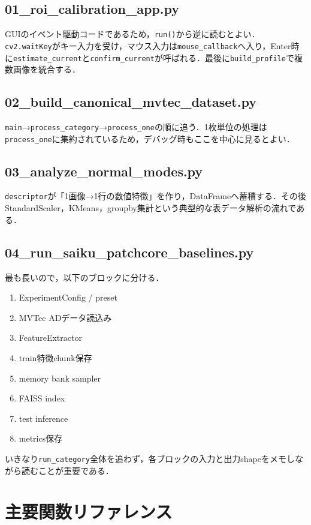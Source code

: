 \documentclass[a4paper,11pt]{ltjsreport}
\begin{document}
\section{01\_roi\_calibration\_app.py}
GUIのイベント駆動コードであるため，\texttt{run()}から逆に読むとよい．\texttt{cv2.waitKey}がキー入力を受け，マウス入力は\texttt{mouse\_callback}へ入り，Enter時に\texttt{estimate\_current}と\texttt{confirm\_current}が呼ばれる．最後に\texttt{build\_profile}で複数画像を統合する．

\section{02\_build\_canonical\_mvtec\_dataset.py}
\texttt{main}→\texttt{process\_category}→\texttt{process\_one}の順に追う．1枚単位の処理は\texttt{process\_one}に集約されているため，デバッグ時もここを中心に見るとよい．

\section{03\_analyze\_normal\_modes.py}
\texttt{descriptor}が「1画像→1行の数値特徴」を作り，DataFrameへ蓄積する．その後StandardScaler，KMeans，groupby集計という典型的な表データ解析の流れである．

\section{04\_run\_saiku\_patchcore\_baselines.py}
最も長いので，以下のブロックに分ける．

\begin{enumerate}
\item ExperimentConfig / preset
\item MVTec ADデータ読込み
\item FeatureExtractor
\item train特徴chunk保存
\item memory bank sampler
\item FAISS index
\item test inference
\item metrics保存
\end{enumerate}

いきなり\texttt{run\_category}全体を追わず，各ブロックの入力と出力shapeをメモしながら読むことが重要である．

\chapter{主要関数リファレンス}
\end{document}
